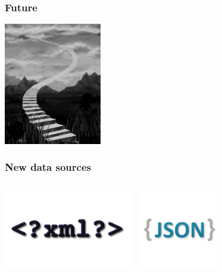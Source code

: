 \documentclass{beamer}
\begin{document}
\begin{frame}
  \frametitle{Future}

  \begin{center}
    \includegraphics[height=2.1in]{avenir.jpg}
  \end{center}
\end{frame}

\begin{frame}
  \frametitle{New data sources}

  
  \begin{columns}[c]
    \begin{center}
      \includegraphics[height=9em]{xml.png}
    \end{center}
    \begin{center}
      \includegraphics[height=9em]{logo-json.png}
    \end{center}
  \end{columns}
\end{frame}
\end{document}

